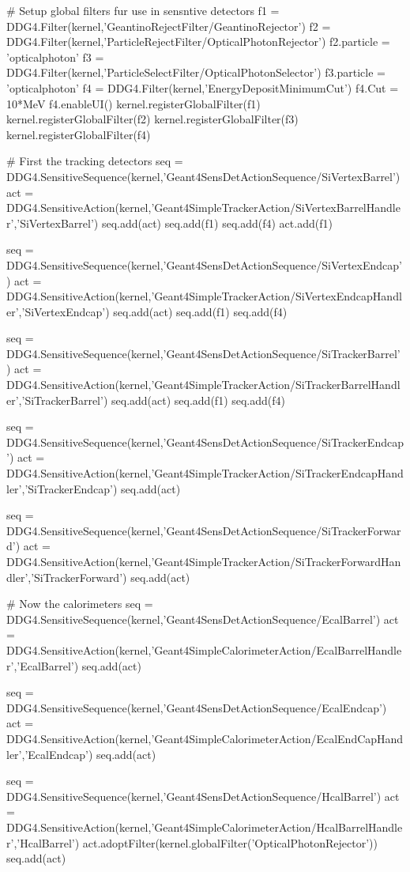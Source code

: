 \documentclass[10pt,a4paper]{article}
\begin{document}
\begin{code}
  # Setup global filters fur use in sensntive detectors
  f1 = DDG4.Filter(kernel,'GeantinoRejectFilter/GeantinoRejector')
  f2 = DDG4.Filter(kernel,'ParticleRejectFilter/OpticalPhotonRejector')
  f2.particle = 'opticalphoton'
  f3 = DDG4.Filter(kernel,'ParticleSelectFilter/OpticalPhotonSelector') 
  f3.particle = 'opticalphoton'
  f4 = DDG4.Filter(kernel,'EnergyDepositMinimumCut')
  f4.Cut = 10*MeV
  f4.enableUI()
  kernel.registerGlobalFilter(f1)
  kernel.registerGlobalFilter(f2)
  kernel.registerGlobalFilter(f3)
  kernel.registerGlobalFilter(f4)

  # First the tracking detectors
  seq = DDG4.SensitiveSequence(kernel,'Geant4SensDetActionSequence/SiVertexBarrel')
  act = DDG4.SensitiveAction(kernel,'Geant4SimpleTrackerAction/SiVertexBarrelHandler','SiVertexBarrel')
  seq.add(act)
  seq.add(f1)
  seq.add(f4)
  act.add(f1)

  seq = DDG4.SensitiveSequence(kernel,'Geant4SensDetActionSequence/SiVertexEndcap')
  act = DDG4.SensitiveAction(kernel,'Geant4SimpleTrackerAction/SiVertexEndcapHandler','SiVertexEndcap')
  seq.add(act)
  seq.add(f1)
  seq.add(f4)

  seq = DDG4.SensitiveSequence(kernel,'Geant4SensDetActionSequence/SiTrackerBarrel')
  act = DDG4.SensitiveAction(kernel,'Geant4SimpleTrackerAction/SiTrackerBarrelHandler','SiTrackerBarrel')
  seq.add(act)
  seq.add(f1)
  seq.add(f4)

  seq = DDG4.SensitiveSequence(kernel,'Geant4SensDetActionSequence/SiTrackerEndcap')
  act = DDG4.SensitiveAction(kernel,'Geant4SimpleTrackerAction/SiTrackerEndcapHandler','SiTrackerEndcap')
  seq.add(act)

  seq = DDG4.SensitiveSequence(kernel,'Geant4SensDetActionSequence/SiTrackerForward')
  act = DDG4.SensitiveAction(kernel,'Geant4SimpleTrackerAction/SiTrackerForwardHandler','SiTrackerForward')
  seq.add(act)

  # Now the calorimeters
  seq = DDG4.SensitiveSequence(kernel,'Geant4SensDetActionSequence/EcalBarrel')
  act = DDG4.SensitiveAction(kernel,'Geant4SimpleCalorimeterAction/EcalBarrelHandler','EcalBarrel')
  seq.add(act)

  seq = DDG4.SensitiveSequence(kernel,'Geant4SensDetActionSequence/EcalEndcap')
  act = DDG4.SensitiveAction(kernel,'Geant4SimpleCalorimeterAction/EcalEndCapHandler','EcalEndcap')
  seq.add(act)

  seq = DDG4.SensitiveSequence(kernel,'Geant4SensDetActionSequence/HcalBarrel')
  act = DDG4.SensitiveAction(kernel,'Geant4SimpleCalorimeterAction/HcalBarrelHandler','HcalBarrel')
  act.adoptFilter(kernel.globalFilter('OpticalPhotonRejector'))
  seq.add(act)


\end{code}
\end{document}
